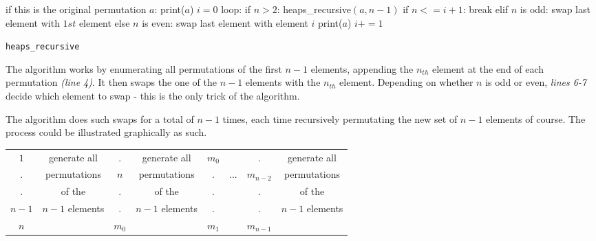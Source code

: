 \documentclass{article}
\begin{document}
\SetEndCharOfAlgoLine{}
\begin{center}
	\begin{minipage}{0.75\linewidth} %
		\begin{algorithm}[H]
			\medskip
    		\nl if this is the original permutation $a$: print($a$)\;
    		\medskip
    		\nl $i=0$\;
    		\nl loop:\;
            \Indp
		        \nl if $n>2$:
            		heaps\_recursive$(a,n-1)$\;
		        \nl if $n<=i+1$:
            		break\;
        		\nl elif $n$ is odd:
            		swap last element with $1st$ element\;
				\nl else $n$ is even:
            		swap last element with element $i$\;
        		\nl print($a$)\;
        		\nl $i+=1$

			\caption{\texttt{heaps\_recursive}} %
		\end{algorithm}
	\end{minipage}
\end{center}

The algorithm works by enumerating all permutations of the first \(n-1\) elements, appending the \(n_{th}\) element at the end of each permutation \textit{(line 4)}. It then swaps the one of the \(n-1\) elements with the \(n_{th}\) element. Depending on whether \(n\) is odd or even, \textit{lines 6-7} decide which element to swap - this is the only trick of the algorithm.

The algorithm does such swaps for a total of \(n-1\) times, each time recursively permutating the new set of \(n-1\) elements of course. The process could be  illustrated graphically as such.\\

\begin{table}[H]
\centering
\begin{tabular}{|c|c|c|c|c|c|c|c} 
\cline{1-1}\cline{3-3}\cline{5-5}\cline{7-7}
 \(1\)		& generate all		& .		& generate all		& \(m_0\)	& 		& .			& generate all	\\
 .			& permutations		& \(n\)	& permutations		& .			& ...	& \(m_{n-2}\)	& permutations\\
 .			& of the			& .		& of the			& .			& 		& .			& of the 	\\
 \(n-1\)	& \(n-1\) elements	& .		& \(n-1\) elements		& .			& 		& .			& \(n-1\) elements\\
\cline{1-1}\cline{3-3}\cline{5-5}\cline{7-7}
\multicolumn{1}{c}{\(n\)} & \multicolumn{1}{c}{} & \multicolumn{1}{c}{\(m_0\)} & \multicolumn{1}{c}{} & \multicolumn{1}{c}{\(m_1\)} & \multicolumn{1}{c}{} & \multicolumn{1}{c}{\(m_{n-1}\)} &  
\end{tabular}
\end{table}
\end{document}
